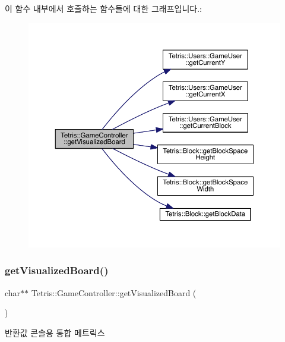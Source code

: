이 함수 내부에서 호출하는 함수들에 대한 그래프입니다.\+:
\nopagebreak
\begin{figure}[H]
\begin{center}
\leavevmode
\includegraphics[width=350pt]{class_tetris_1_1_game_controller_a78b39bdb39707e119d6e708bdb2aca17_cgraph}
\end{center}
\end{figure}
\mbox{\label{class_tetris_1_1_game_controller_aa0d81626f41c784dc256069293719e5f}} 
\subsubsection{\texorpdfstring{get\+Visualized\+Board()}{getVisualizedBoard()}\hspace{0.1cm}{\footnotesize\ttfamily [2/2]}}
{\footnotesize\ttfamily char$\ast$$\ast$ Tetris\+::\+Game\+Controller\+::get\+Visualized\+Board (\begin{DoxyParamCaption}{ }\end{DoxyParamCaption})\hspace{0.3cm}{\ttfamily [inline]}}

\begin{DoxyReturn}{반환값}
콘솔용 통합 메트릭스 
\end{DoxyReturn}



